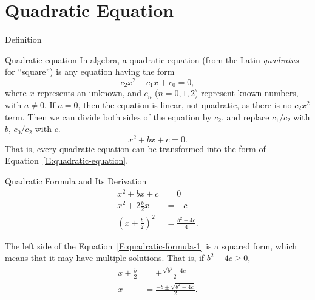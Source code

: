\section{Quadratic Equation}
\begin{frame}[t]{Definition}
    \begin{block}{Quadratic equation}
        In algebra, a quadratic equation (from the Latin \emph{quadratus} for ``square'') is any equation having the form
        \begin{equation}\label{E:1}
            c_2 x^2 + c_1 x + c_0 = 0,
        \end{equation}
        where $x$ represents an unknown, and $c_n$ ($n=0,1,2$) represent known numbers, with $a\neq 0$. If $a=0$, then the equation is linear, not quadratic, as there is no $c_2 x^2$ term. Then we can divide both sides of the equation by $c_2$, and replace $c_1/c_2$ with $b$, $c_0/c_2$ with $c$.
        \begin{equation}\label{E:quadratic-equation}
            x^2 + bx + c = 0.
        \end{equation}
        That is, every quadratic equation can be transformed into the form of Equation~\eqref{E:quadratic-equation}.
    \end{block}
\end{frame}

\begin{frame}[t]{Quadratic Formula and Its Derivation}
    \begin{equation}\label{E:quadratic-formula-1}
        \begin{aligned}
            x^2 + bx + c &= 0 \\
            x^2 + 2\frac{b}{2}x &= -c \\
            \left(x+\frac{b}{2}\right)^2 &= \frac{b^2-4c}{4}.
        \end{aligned}
    \end{equation}
    
    The left side of the Equation~\eqref{E:quadratic-formula-1} is a squared form, which means that it may have multiple solutions. That is, if $b^2-4c\geq 0$,
    \begin{equation}\label{E:quadratic-formula-2}
        \begin{aligned}
            x + \frac{b}{2} &= \pm \frac{\sqrt{b^2-4c}}{2} \\
            x &= \frac{-b\pm\sqrt{b^2-4c}}{2}.
        \end{aligned}
    \end{equation}
\end{frame}



